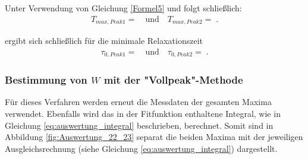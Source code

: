 Unter Verwendung von Gleichung \eqref{Formel5} und folgt schließlich:
\begin{align}
	T_{max,Peak1} =   \quad \text{und} \quad T_{max,Peak2} = \;.
\end{align}

ergibt sich schließlich für die minimale Relaxationszeit
\begin{align}
	\tau_{0,Peak1} =   \quad \text{und} \quad \tau_{0,Peak2} = \;.
\end{align}

\subsubsection{Bestimmung von $W$ mit der "Vollpeak"-Methode}

Für dieses Verfahren werden erneut die Messdaten der gesamten Maxima verwendet. Ebenfalls wird das in der Fitfunktion enthaltene Integral, wie in Gleichung \ref{eq:auswertung_integral} beschrieben, berechnet. Somit sind in Abbildung \ref{fig:Auswertung_22_23} separat die beiden Maxima mit der jeweiligen Ausgleichsrechnung (siehe Gleichung \ref{eq:auswertung_integral}) dargestellt.

